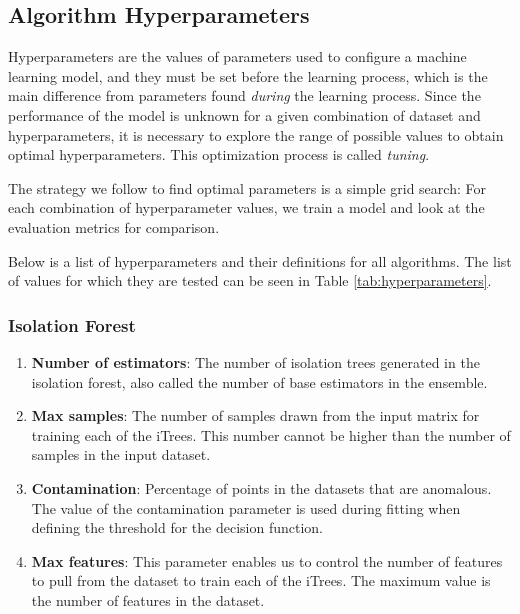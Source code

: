 \subsection{Algorithm Hyperparameters}
Hyperparameters are the values of parameters used to configure a machine learning model, and they must be set before the learning process, which is the main difference from parameters found \textit{during} the learning process. Since the performance of the model is unknown for a given combination of dataset and hyperparameters, it is necessary to explore the range of possible values to obtain optimal hyperparameters. This optimization process is called \textit{tuning}.

The strategy we follow to find optimal parameters is a simple grid search: For each combination of hyperparameter values, we train a model and look at the evaluation metrics for comparison.

Below is a list of hyperparameters and their definitions for all algorithms. The list of values for which they are tested can be seen in Table \ref{tab:hyperparameters}.



\subsubsection*{Isolation Forest}
\begin{enumerate}
    \item \textbf{Number of estimators}: The number of isolation trees generated in the isolation forest, also called the number of base estimators in the ensemble.
    \item \textbf{Max samples}: The number of samples drawn from the input matrix for training each of the iTrees. This number cannot be higher than the number of samples in the input dataset. 
    \item \textbf{Contamination}: Percentage of points in the datasets that are anomalous. The value of the contamination parameter is used during fitting when defining the threshold for the decision function.
    \item \textbf{Max features}: This parameter enables us to control the number of features to pull from the dataset to train each of the iTrees. The maximum value is the number of features in the dataset. 
\end{enumerate}

